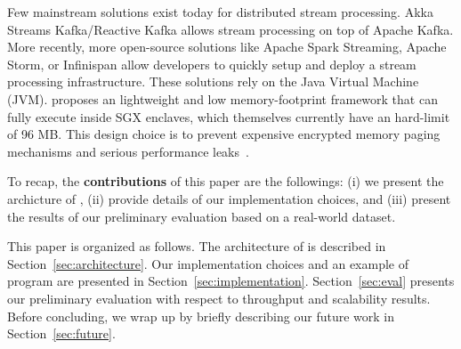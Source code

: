 Few mainstream solutions exist today for distributed stream processing.
Akka Streams Kafka/Reactive Kafka\cite{reactivekafka} allows stream processing on top of Apache Kafka\cite{apachekafka}.
More recently, more open-source solutions like Apache Spark Streaming\cite{apachesparkstreaming}, Apache Storm\cite{apachestorm}, or Infinispan\cite{infinispan} allow developers to quickly setup and deploy a stream processing infrastructure. 
These solutions rely on the Java Virtual Machine (JVM)\cite{}.
\SYS proposes an lightweight and low memory-footprint framework that can fully execute inside SGX enclaves, which themselves currently have an hard-limit of 96 MB.
This design choice is to prevent expensive encrypted memory paging mechanisms and serious performance leaks~\cite{brenner_securekeeper:_2016}.  

To recap, the \textbf{contributions} of this paper are the followings: (i) we present the archicture of \SYS, (ii) provide details of our implementation choices, and (iii) present the results of our preliminary evaluation based on a real-world dataset. 

This paper is organized as follows. 
The architecture of \SYS is described in Section~\ref{sec:architecture}.
Our implementation choices and an example of \SYS program are presented in Section~\ref{sec:implementation}.
Section~\ref{sec:eval} presents our preliminary evaluation with respect to throughput and scalability results.
Before concluding, we wrap up by briefly describing our future work in Section~\ref{sec:future}. 